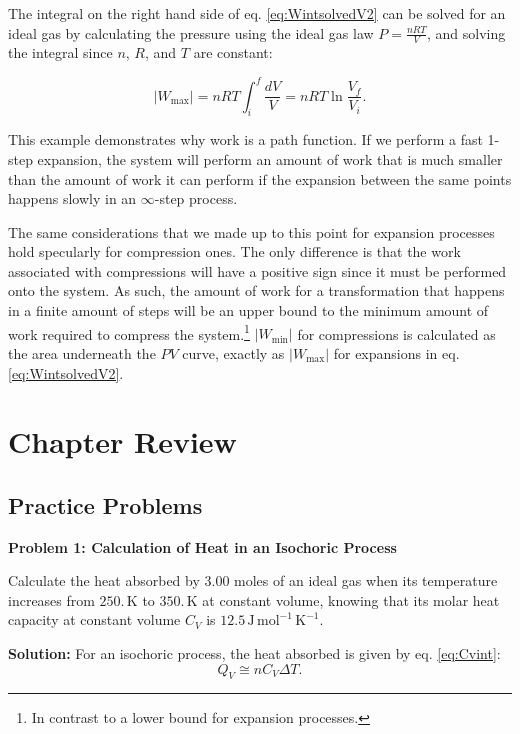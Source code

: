 \documentclass[
  9pt,
]{extbook}
\theoremstyle{definition}
\theoremstyle{definition}
\theoremstyle{definition}
\theoremstyle{definition}
\theoremstyle{remark}
\begin{document}
The integral on the right hand side of eq. \eqref{eq:WintsolvedV2} can be solved for an ideal gas by calculating the pressure using the ideal gas law \(P=\frac{nRT}{V}\), and solving the integral since \(n\), \(R\), and \(T\) are constant:

\begin{equation}
  \left| W_{\text{max}} \right| = nRT \int_{i}^{f} \frac{dV}{V} = nRT \ln \frac{V_f}{V_i}.
  \label{eq:WmaxV}
\end{equation}

This example demonstrates why work is a path function. If we perform a fast 1-step expansion, the system will perform an amount of work that is much smaller than the amount of work it can perform if the expansion between the same points happens slowly in an \(\infty\)-step process.

The same considerations that we made up to this point for expansion processes hold specularly for compression ones. The only difference is that the work associated with compressions will have a positive sign since it must be performed onto the system. As such, the amount of work for a transformation that happens in a finite amount of steps will be an upper bound to the minimum amount of work required to compress the system.\footnote{In contrast to a lower bound for expansion processes.} \(\left| W_{\text{min}} \right|\) for compressions is calculated as the area underneath the \(PV\) curve, exactly as \(\left| W_{\text{max}} \right|\) for expansions in eq. \eqref{eq:WintsolvedV2}.

\section{Chapter Review}\label{rev2}

\subsection{Practice Problems}\label{exer2}

\textbf{Problem 1: Calculation of Heat in an Isochoric Process}

Calculate the heat absorbed by 3.00 moles of an ideal gas when its temperature increases from \(250.\, \text{K}\) to \(350.\, \text{K}\) at constant volume, knowing that its molar heat capacity at constant volume \(C_V\) is \(12.5 \, \text{J} \, \text{mol}^{-1} \, \text{K}^{-1}\).

\textbf{Solution:} For an isochoric process, the heat absorbed is given by eq. \eqref{eq:Cvint}: \[  Q_V \cong n C_V \Delta T.\]
\end{document}
